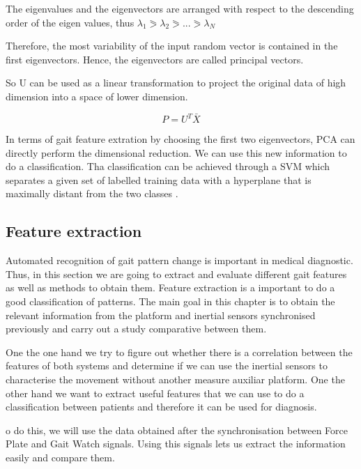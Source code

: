 The eigenvalues and the eigenvectors are arranged with respect to the descending order of the eigen values, thus $\lambda_{1}\eqslantgtr\lambda_{2}\eqslantgtr...\eqslantgtr\lambda_{N}$

Therefore, the most variability of the input random vector is contained in the first eigenvectors. Hence, the eigenvectors are called principal vectors.

So U can be used as a linear transformation to project the original data of high dimension into a space of lower dimension.

$$P=U^T\bar{X}$$

In terms of gait feature extration by choosing the first two eigenvectors, PCA can directly perform the dimensional reduction\cite{Jeon}.
We can use this new information to do a classification. Tha classification can be achieved through a SVM which separates a given set of labelled training data with a hyperplane that is maximally distant from the two classes \cite{Gorriz}.

\subsection{Feature extraction}
Automated recognition of gait pattern change is important in medical diagnostic. Thus, in this section we are going to extract and evaluate different gait features as well as methods to obtain them. Feature extraction is a important	to do a good classification of patterns.
The main goal in this chapter is to obtain the relevant information from the platform and inertial sensors synchronised previously and carry out a study comparative between them.

One the one hand we try to figure out whether there is a correlation between the features of both systems and determine if we can use the inertial sensors to characterise the movement without another measure auxiliar  platform.
One the other hand we want to extract useful features that we can use to do a classification between patients and therefore it can be used for diagnosis.

o do this, we will use the data obtained after the synchronisation between Force Plate and Gait Watch signals. Using this signals lets us extract the information easily and compare them.

